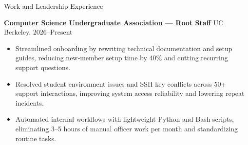 \documentclass{resume}
\begin{document}
\begin{rSection}{Work and Leadership Experience}

\textbf{Computer Science Undergraduate Association — Root Staff} \hfill UC Berkeley, 2026–Present
\begin{itemize}
  \item Streamlined onboarding by rewriting technical documentation and setup guides, reducing new‑member setup time by 40\% and cutting recurring support questions.
  \item Resolved student environment issues and SSH key conflicts across 50+ support interactions, improving system access reliability and lowering repeat incidents.
  \item Automated internal workflows with lightweight Python and Bash scripts, eliminating 3--5 hours of manual officer work per month and standardizing routine tasks.
\end{itemize}


\end{rSection}
\end{document}
